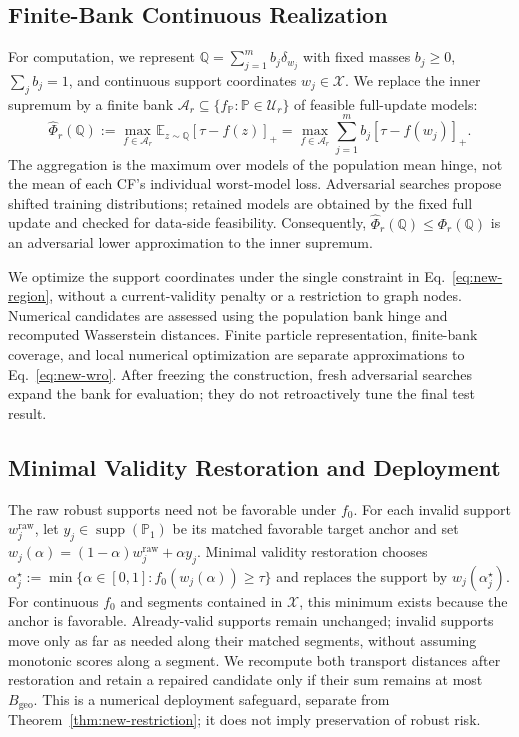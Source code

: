 \subsection{Finite-Bank Continuous Realization}
\label{sec:new-realization}

For computation, we represent $\mathbb Q=\sum_{j=1}^m b_j\delta_{w_j}$ with fixed masses $b_j\ge0$, $\sum_j b_j=1$, and continuous support coordinates $w_j\in\mathcal X$.
We replace the inner supremum by a finite bank $\mathcal A_r\subseteq\{f_{\mathbb P}:\mathbb P\in\mathcal U_r\}$ of feasible full-update models:
\begin{equation}
\widehat\Phi_r(\mathbb Q)
:=\max_{f\in\mathcal A_r}\mathbb E_{z\sim\mathbb Q}[\tau-f(z)]_+
=\max_{f\in\mathcal A_r}\sum_{j=1}^m b_j[\tau-f(w_j)]_+.
\label{eq:new-bank-risk}
\end{equation}
The aggregation is the maximum over models of the population mean hinge, not the mean of each CF's individual worst-model loss.
Adversarial searches propose shifted training distributions; retained models are obtained by the fixed full update and checked for data-side feasibility.
Consequently, $\widehat\Phi_r(\mathbb Q)\le\Phi_r(\mathbb Q)$ is an adversarial lower approximation to the inner supremum.

We optimize the support coordinates under the single constraint in Eq.~\ref{eq:new-region}, without a current-validity penalty or a restriction to graph nodes.
Numerical candidates are assessed using the population bank hinge and recomputed Wasserstein distances.
Finite particle representation, finite-bank coverage, and local numerical optimization are separate approximations to Eq.~\ref{eq:new-wro}.
After freezing the construction, fresh adversarial searches expand the bank for evaluation; they do not retroactively tune the final test result.

\subsection{Minimal Validity Restoration and Deployment}
\label{sec:new-deployment}

The raw robust supports need not be favorable under $f_0$.
For each invalid support $w_j^{\mathrm{raw}}$, let $y_j\in\operatorname{supp}(\mathbb P_1)$ be its matched favorable target anchor and set $w_j(\alpha)=(1-\alpha)w_j^{\mathrm{raw}}+\alpha y_j$.
Minimal validity restoration chooses $\alpha_j^\star:=\min\{\alpha\in[0,1]:f_0(w_j(\alpha))\ge\tau\}$ and replaces the support by $w_j(\alpha_j^\star)$.
For continuous $f_0$ and segments contained in $\mathcal X$, this minimum exists because the anchor is favorable.
Already-valid supports remain unchanged; invalid supports move only as far as needed along their matched segments, without assuming monotonic scores along a segment.
We recompute both transport distances after restoration and retain a repaired candidate only if their sum remains at most $B_{\mathrm{geo}}$.
This is a numerical deployment safeguard, separate from Theorem~\ref{thm:new-restriction}; it does not imply preservation of robust risk.

